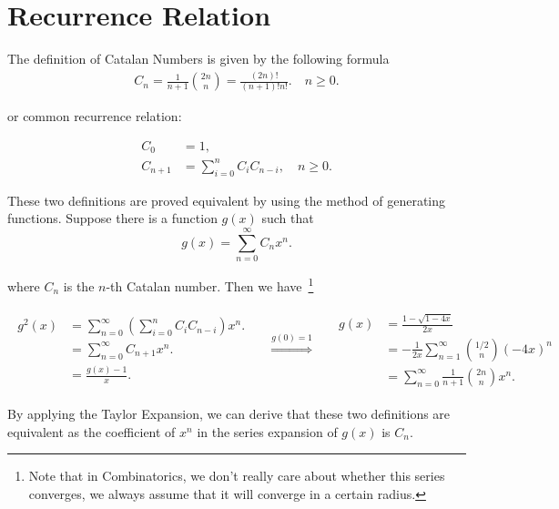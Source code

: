 \section{Recurrence Relation}
The definition of Catalan Numbers is given by the following formula
\begin{equation}
    \begin{aligned}
        C_n = \frac{1}{n+1}\binom{2n}{n} = \frac{(2n)!}{(n+1)!n!}.\quad n \geq 0. 
    \end{aligned}
\end{equation}

or common recurrence relation:

\begin{equation}
    \begin{aligned}
        C_0     & = 1,                                          \\
        C_{n+1} & = \sum_{i=0}^{n} C_i C_{n-i}, \quad n \geq 0.
    \end{aligned}
\end{equation}

These two definitions are proved equivalent by using the method of generating functions.
Suppose there is a function $g(x)$ such that
\begin{equation}
    g(x) = \sum_{n=0}^{\infty} C_n x^n. \label{generating-function}
\end{equation}


where $C_n$ is the $n$-th Catalan number. Then we have~\footnote[1]{Note that in Combinatorics, we don't really care about whether this series converges, we always assume that it will converge in a certain radius.}

\begin{equation}
    \begin{split}
        \begin{aligned}
            g^2(x)
             & = \sum_{n=0}^{\infty} \left(\sum_{i=0}^{n} C_i C_{n-i}\right) x^n. \\
             & = \sum_{n=0}^{\infty} C_{n+1} x^n.                                 \\
             & = \frac{g(x) - 1}{x}.
        \end{aligned}
    \end{split}
    \quad \stackrel{g(0)=1}{\Longrightarrow} \quad
    \begin{split}
        \begin{aligned}
            g(x)
             & = \frac{1 - \sqrt{1 - 4x}}{2x}                               \\
             & = -\frac{1}{2x}\sum_{n=1}^{\infty}\binom{1 / 2}{n}(-4 x)^{n} \\
             & = \sum_{n=0}^{\infty} \frac{1}{n+1}\binom{2n}{n}x^n.
        \end{aligned}
    \end{split}
\end{equation}


\noindent By applying the Taylor Expansion, we can derive that these two definitions are equivalent as the coefficient of $x^n$ in the series expansion of $g(x)$ is $C_n$.